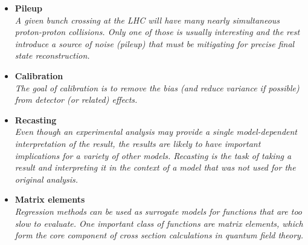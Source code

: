 \documentclass[12pt,letterpaper]{article}
\begin{document}
\begin{itemize}
	\begin{itemize}
		\item \textbf{Pileup}~\cite{Komiske:2017ubm,ATL-PHYS-PUB-2019-028,Martinez:2018fwc,Carrazza:2019efs,Maier:2021ymx,Li:2022omf,CRESST:2022qor,Kim:2023koz}
		\\\textit{A given bunch crossing at the LHC will have many nearly simultaneous proton-proton collisions.  Only one of those is usually interesting and the rest introduce a source of noise (pileup) that must be mitigating for precise final state reconstruction.}
		\item \textbf{Calibration}~\cite{Cheong:2019upg,ATL-PHYS-PUB-2020-001,ATL-PHYS-PUB-2018-013,Hooberman:DLPS2017,Kasieczka:2020vlh,Sirunyan:2019wwa,Baldi:2020hjm,Du:2020pmp,Kieseler:2021jxc,Pollard:2021fqv,Akchurin:2021afn,Kieseler:2020wcq,Akchurin:2021ahx,Diefenthaler:2021rdj,Polson:2021kvr,Micallef:2021src,Arratia:2021tsq,Kronheim:2021hdb,Renteria-Estrada:2021zrd,Pata:2022wam,Chadeeva:2022kay,Dorigo:2022tfi,Alves:2022gnw,Qiu:2022xvr,Akchurin:2022apq,Gambhir:2022gua,Gambhir:2022dut,Valsecchi:2022rla,Leigh:2022lpn,Darulis:2022brn,Ge:2022xrv,Guglielmi:2022ftj,Aad:2023ula,Lee:2023jew,Schwenker:2023bih,Basak:2023wzq,Grosso:2023jxp,Grosso:2023ltd,Soleymaninia:2023dds,Raine:2023fko,Khozani:2023bql,ATLAS:2023tyv,ALICETPC:2023ojd,Meyer:2023ffd,Holmberg:2023rfr}
		\\\textit{The goal of calibration is to remove the bias (and reduce variance if possible) from detector (or related) effects.}
		\item \textbf{Recasting}~\cite{Caron:2017hku,Bertone:2016mdy,1806026,Hammad:2022wpq}
		\\\textit{Even though an experimental analysis may provide a single model-dependent interpretation of the result, the results are likely to have important implications for a variety of other models.  Recasting is the task of taking a result and interpreting it in the context of a model that was not used for the original analysis.}
		\item \textbf{Matrix elements}~\cite{Badger:2020uow,Bishara:2019iwh,1804325,Bury:2020ewi,Sombillo:2021yxe,Sombillo:2021rxv,Aylett-Bullock:2021hmo,Maitre:2021uaa,Danziger:2021eeg,Winterhalder:2021ngy,Karl:2022jda,Alnuqaydan:2022ncd,Dersy:2022bym,Badger:2022hwf,Janssen:2023ahv,Maitre:2023dqz}
		\\\textit{Regression methods can be used as surrogate models for functions that are too slow to evaluate.  One important class of functions are matrix elements, which form the core component of cross section calculations in quantum field theory.}

\end{itemize}
\end{itemize}
\end{document}
